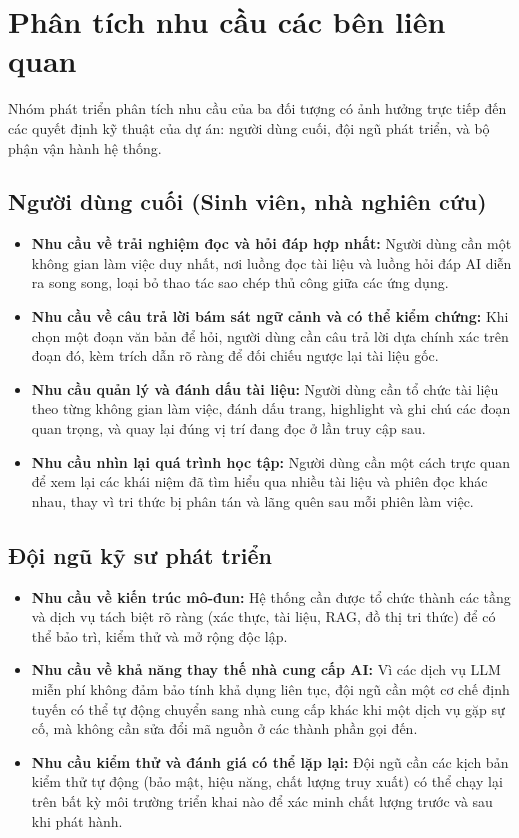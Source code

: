 \section{Phân tích nhu cầu các bên liên quan}
Nhóm phát triển phân tích nhu cầu của ba đối tượng có ảnh hưởng trực tiếp đến các quyết định kỹ thuật của dự án: người dùng cuối, đội ngũ phát triển, và bộ phận vận hành hệ thống.

\subsection{Người dùng cuối (Sinh viên, nhà nghiên cứu)}
\begin{itemize}
    \item \textbf{Nhu cầu về trải nghiệm đọc và hỏi đáp hợp nhất:} Người dùng cần một không gian làm việc duy nhất, nơi luồng đọc tài liệu và luồng hỏi đáp AI diễn ra song song, loại bỏ thao tác sao chép thủ công giữa các ứng dụng.
    \item \textbf{Nhu cầu về câu trả lời bám sát ngữ cảnh và có thể kiểm chứng:} Khi chọn một đoạn văn bản để hỏi, người dùng cần câu trả lời dựa chính xác trên đoạn đó, kèm trích dẫn rõ ràng để đối chiếu ngược lại tài liệu gốc.
    \item \textbf{Nhu cầu quản lý và đánh dấu tài liệu:} Người dùng cần tổ chức tài liệu theo từng không gian làm việc, đánh dấu trang, highlight và ghi chú các đoạn quan trọng, và quay lại đúng vị trí đang đọc ở lần truy cập sau.
    \item \textbf{Nhu cầu nhìn lại quá trình học tập:} Người dùng cần một cách trực quan để xem lại các khái niệm đã tìm hiểu qua nhiều tài liệu và phiên đọc khác nhau, thay vì tri thức bị phân tán và lãng quên sau mỗi phiên làm việc.
\end{itemize}

\subsection{Đội ngũ kỹ sư phát triển}
\begin{itemize}
    \item \textbf{Nhu cầu về kiến trúc mô-đun:} Hệ thống cần được tổ chức thành các tầng và dịch vụ tách biệt rõ ràng (xác thực, tài liệu, RAG, đồ thị tri thức) để có thể bảo trì, kiểm thử và mở rộng độc lập.
    \item \textbf{Nhu cầu về khả năng thay thế nhà cung cấp AI:} Vì các dịch vụ LLM miễn phí không đảm bảo tính khả dụng liên tục, đội ngũ cần một cơ chế định tuyến có thể tự động chuyển sang nhà cung cấp khác khi một dịch vụ gặp sự cố, mà không cần sửa đổi mã nguồn ở các thành phần gọi đến.
    \item \textbf{Nhu cầu kiểm thử và đánh giá có thể lặp lại:} Đội ngũ cần các kịch bản kiểm thử tự động (bảo mật, hiệu năng, chất lượng truy xuất) có thể chạy lại trên bất kỳ môi trường triển khai nào để xác minh chất lượng trước và sau khi phát hành.
\end{itemize}

